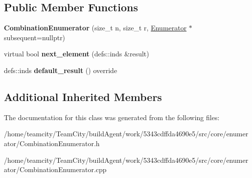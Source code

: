 \subsection*{Public Member Functions}
\begin{DoxyCompactItemize}
\item 
{\bfseries Combination\+Enumerator} (size\+\_\+t n, size\+\_\+t r, \hyperlink{classEnumerator}{Enumerator} $\ast$subsequent=nullptr)\hypertarget{classCombinationEnumerator_a26b255c3e1743191189c68cff3a93120}{}\label{classCombinationEnumerator_a26b255c3e1743191189c68cff3a93120}

\item 
virtual bool {\bfseries next\+\_\+element} (defs\+::inds \&result)\hypertarget{classCombinationEnumerator_a7e9a1848cae9ef46a65883b47f76d994}{}\label{classCombinationEnumerator_a7e9a1848cae9ef46a65883b47f76d994}

\item 
defs\+::inds {\bfseries default\+\_\+result} () override\hypertarget{classCombinationEnumerator_aec8be6907ffc568e9d665184630f0d5e}{}\label{classCombinationEnumerator_aec8be6907ffc568e9d665184630f0d5e}

\end{DoxyCompactItemize}
\subsection*{Additional Inherited Members}


The documentation for this class was generated from the following files\+:\begin{DoxyCompactItemize}
\item 
/home/teamcity/\+Team\+City/build\+Agent/work/5343cdffda4690e5/src/core/enumerator/Combination\+Enumerator.\+h\item 
/home/teamcity/\+Team\+City/build\+Agent/work/5343cdffda4690e5/src/core/enumerator/Combination\+Enumerator.\+cpp\end{DoxyCompactItemize}
